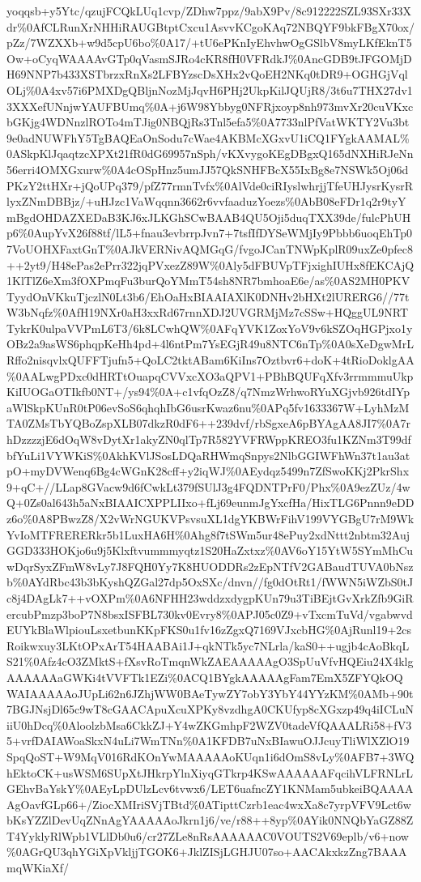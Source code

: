 \documentclass[]{article}
\begin{document}
yoqqsb+y5Ytc/qzujFCQkLUq1cvp/ZDhw7ppz/9abX9Pv/8c912222SZL93SXr33Xdr\%0AfCLRunXrNHHiRAUGBtptCxcu1AsvvKCgoKAq72NBQYF9bkFBgX70ox/pZz/7WZXXb+w9d5cpU6bo\%0A17/+tU6ePKnIyEhvhwOgGSlbV8myLKfEknT5Ow+oCyqWAAAAvGTp0qVasmSJRo4cKR8fH0VFRdkJ\%0AncGDB9tJFGOMjDH69NNP7b433XSTbrzxRnXs2LFBYzscDsXHx2vQoEH2NKq0tDR9+OGHGjVqlOLj\%0A4xv57i6PMXDgQBljnNozMjJqvH6PHj2UkpKilJQUjR8/3t6u7THX27dv13XXXefUNnjwYAUFBUmq\%0A+j6W98Ybbyg0NFRjxoyp8nh973mvXr20cuVKxcbGKjg4WDNnzlROTo4mTJig0NBQjRs3Tnl5efa5\%0A7733nlPfVatWKTY2Vu3bt9e0adNUWFhY5TgBAQEaOnSodu7cWae4AKBMcXGxvU1iCQ1FYgkAAMAL\%0ASkpKlJqaqtzcXPXt21fR0dG69957nSph/vKXvygoKEgDBgxQ165dNXHiRJeNn56erri4OMXGxurw\%0A4cOSpHnz5umJJ57QkSNHFBcX55IxBg8e7NSWk5Oj06dPKzY2ttHXr+jQoUPq379/pfZ77rmnTvfx\%0AlVde0ciRIyslwhrjjTfeUHJysrKysrRlyxZNmDBBjz/+uHJzc1VaWqqnn3662r6vvfaaduzYoezs\%0AbB08eFDr1q2r9tyYmBgdOHDAZXEDaB3KJ6xJLKGhSCwBAAB4QU5Oji5duqTXX39de/fulcPhUHp6\%0AupYvX26f88tf/lL5+fnau3evbrrpJvn7+7tsfIfDYSeWMjIy9Pbbb6uoqEhTp07VoUOHXFaxtGnT\%0AJkVERNivAQMGqG/fvgoJCanTNWpKplR09uxZe0pfec8++2yt9/H48ePas2ePrr322jqPVxezZ89W\%0Aly5dFBUVpTFjxighIUHx8fEKCAjQ1KlTlZ6eXm3fOXPmqFu3burQoYMmT54sh8NR7bmhoaE6e/as\%0AS2MH0PKVTyydOnVKkuTjczlN0Lt3b6/EhOaHxBIAAIAXlK0DNHv2bHXt2lURERG6//77tW3bNqfz\%0AfH19NXr0aH3xxRd67rnnXDJ2UVGRMjMz7cSSw+HQggUL9NRTTykrK0ulpaVVPmL6T3/6k8LCwhQW\%0AFqYVK1ZoxYoV9v6kSZOqHGPjxo1yOBz2a9asWS6phqpKeHh4pd+4l6ntPm7YsEGjR49u8NTC6nTp\%0A0sXeDgwMrLRffo2nisqvlxQUFFTjufn5+QoLC2tktABam6KiIns7Oztbvr6+doK+4tRioDoklgAA\%0AALwgPDxc0dHRTtOuapqCVVxcXO3aQPV1+PBhBQUFqXfv3rrmmmuUkpKiIUOGaOTIkfb0NT+/ys94\%0A+c1vfqOzZ8/q7NmzWrhwoRYuXGjvb926tdIYpaWlSkpKUnR0tP06evSoS6qhqhIbG6usrKwaz6nu\%0APq5fv1633367W+LyhMzMTA0ZMsTbYQBoZspXLB07dkzR0dF6++239dvf/rbSgxeA6pBYAgAA8JI7\%0A7rhDzzzzjE6dOqW8vDytXr1akyZN0qlTp7R582YVFRWppKREO3fu1KZNm3T99dfbfYuLi1VYWKiS\%0AkhKVlJSosLDQaRHWmqSnpys2NlbGGIWFhWn37t1au3atpO+myDVWenq6Bg4cWGnK28cff+y2iqWJ\%0AEydqz5499n7ZfSwoKKj2PkrShx9+qC+//LLap8GVacw9d6fCwkLt379fSUlJ3g4FQDNTPrF0/Phx\%0A9ezZUz/4wQ+0Zs0al643h5aNxBIAAICXPPLIIxo+fLj69eunmJgYxcfHa/HixTLG6Pnnn9eDDz6o\%0A8PBwzZ8/X2vWrNGUKVPsvsuXL1dgYKBWrFihV199VYGBgU7rM9WkYvIoMTFRERERkr5b1LuxHA6H\%0Ahg8f7tSWm5ur48ePuy2xdNttt2nbtm32AujGGD333HOKjo6u9j5Klxftvummmyqtz1S20HaZxtxz\%0AV6oY15YtW5SYmMhCuwDqrSyxZFmW8vLy7J8FQH0Yy7K8HUODDRs2zEpNTfV2GABaudTUVA0bNszb\%0AYdRbc43b3bKyshQZGal27dp5OxSXc/dnvn//fg0dOtRt1/fWWN5iWZbS0tJc8j4DAgLk7++vOXPm\%0A6NFHH23wddzxdygpKUn79u3TiBEjtGvXrkZfb9GiRercubPmzp3boP7N8bsxISFBL730kv0Evry8\%0APJ05c0Z9+vTxcmTuVd/vgabwvdEUYkBlaWlpiouLsxetbunKKpFKS0u1fv16zZgxQ7169VJxcbHG\%0AjRunl19+2csRoikwxuy3LKtOPxArT54HAABAi1J+qkNTk5yc7NLrla/kaS0++ugjb4cAoBkqLS21\%0Afz4cO3ZMktS+fXsvRoTmqnWkZAEAAAAAgO3SpUuVfvHQEiu24X4klgAAAAAAaGWKi4tVVFTk1EZi\%0ACQ1BYgkAAAAAgFam7EmX5ZFYQkOQWAIAAAAAoJUpLi62n6JZhjWW0BAeTywZY7obY3YbY44YYzKM\%0AMb+90t7BGJNsjDl65c9wT8cGAACApuXcuXPKy8vzdhgA0CKUfyp8cXGxzp49q4iICLuNiiU0hDcq\%0AloolzbMsa6CkkZJ+Y4wZKGmhpF2WZV0tadeVfQAAALRi58+fV35+vrfDAIAWoaSkxN4uLi7WmTNn\%0A1KFDB7uNxBIawuOJJcuyTliWlXZlO19SpqQoST+W9MqV016RdKOnYwMAAAAAoKUqn1i6dOmS8vLy\%0AFB7+3WQhEktoCK+usWSM6SUpXtJHkrpYlnXiyqGTkrp4KSwAAAAAAFqcihVLFRNLrLGEhvBaYskY\%0AEyLpDUlzLcv6tvwx6/LET6uafncZY1KNMam5ubkeiBQAAAAAgOavfGLp66+/ZiocXMIriSVjTBtd\%0ATipttCzrb1eac4wxXa8c7yrpVFV9Lct6wbKsYZZlDevUqZNnAgYAAAAAoJkrn1j6/ve/r88++8yp\%0AYik0NNQbYaGZ88ZT4YyklyRlWpb1VLlDb0u6/cr27ZLe8nRsAAAAAAC0VOUTS2V69eplb/v6+now\%0AGrQU3qhYGiXpVkljjTGOK6+JklZISjLGHJU07so+AACAkxkzZng7BAAAmqWKiaXf/
\end{document}
